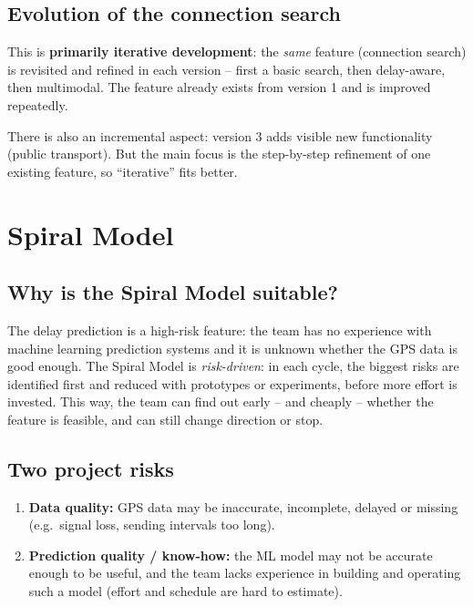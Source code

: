 \documentclass[11pt,a4paper]{article}
\begin{document}
\subsection*{Evolution of the connection search}

This is \textbf{primarily iterative development}: the \emph{same} feature
(connection search) is revisited and refined in each version -- first a
basic search, then delay-aware, then multimodal. The feature already exists
from version 1 and is improved repeatedly.

There is also an incremental aspect: version 3 adds visible new
functionality (public transport). But the main focus is the step-by-step
refinement of one existing feature, so ``iterative'' fits better.

\section{Spiral Model}

\subsection*{Why is the Spiral Model suitable?}

The delay prediction is a high-risk feature: the team has no experience
with machine learning prediction systems and it is unknown whether the GPS
data is good enough. The Spiral Model is \emph{risk-driven}: in each cycle,
the biggest risks are identified first and reduced with prototypes or
experiments, before more effort is invested. This way, the team can find
out early -- and cheaply -- whether the feature is feasible, and can still
change direction or stop.

\subsection*{Two project risks}

\begin{enumerate}[itemsep=0.1em]
  \item \textbf{Data quality:} GPS data may be inaccurate, incomplete,
        delayed or missing (e.g.\ signal loss, sending intervals too long).
  \item \textbf{Prediction quality / know-how:} the ML model may not be
        accurate enough to be useful, and the team lacks experience in
        building and operating such a model (effort and schedule are hard
        to estimate).
\end{enumerate}
\end{document}
